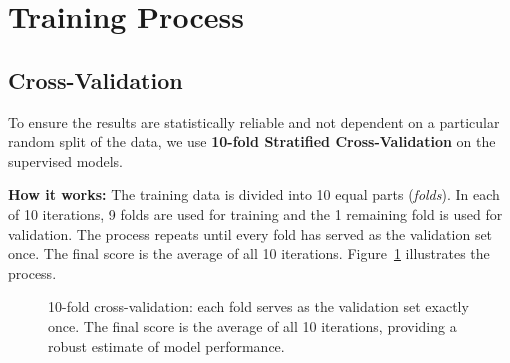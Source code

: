 \section{Training Process}

\subsection{Cross-Validation}

To ensure the results are statistically reliable and not dependent on a particular random split of the data, we use \textbf{10-fold Stratified Cross-Validation} on the supervised models.

\textbf{How it works:} The training data is divided into 10 equal parts (\textit{folds}). In each of 10 iterations, 9 folds are used for training and the 1 remaining fold is used for validation. The process repeats until every fold has served as the validation set once. The final score is the average of all 10 iterations. Figure~\ref{fig:cv} illustrates the process.

\begin{figure}[H]
\centering
{}
\caption{10-fold cross-validation: each fold serves as the validation set exactly once. The final score is the average of all 10 iterations, providing a robust estimate of model performance.}
\label{fig:cv}
\end{figure}

